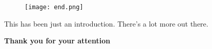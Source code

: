 \documentclass{beamer}
\begin{document}
\begin{frame}
	\vspace{15pt}
	\begin{figure}
		\centering
		\texttt{[image: end.png]}
		\caption*{}
		\label{fig:end}
	\end{figure}
	
	
	This has been just an introduction. There's a lot more out there.
	
	\vspace{10 pt}
	
	\centering \textbf{Thank you for your attention}	
	
	
\end{frame}
	
	
\end{document}
